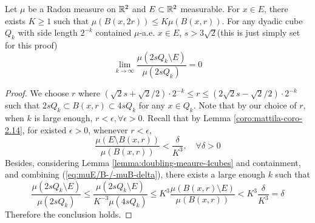 \begin{lemma}\label{lemma:limmuE/2sQ-/-mu2sQ-0}
    Let $\mu$ be a Radon measure on $\mathbb{R}^2$ and $E\subset \mathbb{R}^2$ measurable. For $x\in E$, there exists $K\geq 1$ such that $\mu(B(x, 2r))\leq K\mu(B(x,r))$. For any dyadic cube $Q_k$ with side length $2^{-k}$ contained $\mu$-a.e. $x\in E$, $s>3\sqrt{2}$(this is just simply set for this proof)
    \begin{equation*}
        \lim_{k\rightarrow \infty}\frac{\mu(2sQ_k \setminus E)}{\mu(2sQ_k)} =0
    \end{equation*}
\end{lemma}
\begin{proof}
    We choose $r$ where $(\sqrt{2}s + \sqrt{2}/2) \cdot 2^{-k} \leq r \leq (2\sqrt{2}s - \sqrt{2}/2)\cdot 2^{-k} $ such that $2sQ_k\subset B(x,r)\subset 4sQ_k$ for any $x\in Q_k$. Note that by our choice of $r$, when $k$ is large enough, $r < \epsilon, \forall \epsilon > 0$. Recall that by Lemma \ref{coro:mattila-coro-2.14}, for existed $\epsilon > 0$, whenever $r<\epsilon$, 
    \begin{equation}\label{eq:muE/B-/-muB-delta}
        \frac{\mu(E \setminus B(x, r))}{\mu(B(x, r))} < \frac{\delta}{K^3}, \quad \forall\delta > 0
    \end{equation}
    Besides, considering Lemma \ref{lemma:doubling-meaure-4cubes} and containment, and combining (\ref{eq:muE/B-/-muB-delta}), there exists a large enough $k$ such that 
    \begin{equation*}
        \frac{\mu(2sQ_k \setminus E)}{\mu(2sQ_k)}\leq \frac{\mu(2sQ_k \setminus E)}{K^{-3}\mu(4sQ_k)} \leq K^3 \frac{\mu(B(x, r) \setminus E)}{\mu(B(x, r))} < K^3\frac{\delta}{K^3} = \delta
    \end{equation*}
    Therefore the conclusion holds. 
\end{proof}

